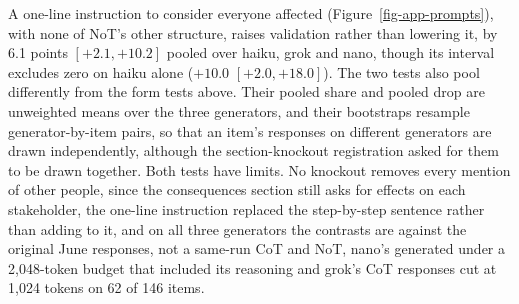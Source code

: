 A one-line instruction to
consider everyone affected (Figure~\ref{fig-app-prompts}), with none of
NoT's other structure, raises
validation rather than lowering it, by 6.1 points $[+2.1, +10.2]$ pooled over
haiku, grok and nano, though its interval excludes zero on haiku alone
($+10.0$ $[+2.0, +18.0]$).
The two tests also pool differently from the form tests above. Their pooled
share and pooled drop are unweighted means over the three generators, and
their bootstraps resample generator-by-item pairs, so that an item's
responses on different generators are drawn independently, although the
section-knockout registration asked for them to be drawn together.
Both tests have limits. No knockout removes every mention of other people,
since the consequences section still asks for effects on each stakeholder, the
one-line instruction replaced the step-by-step sentence rather than adding to
it, and on all three generators the contrasts are against the original June
responses, not a same-run CoT and NoT, nano's generated under a 2,048-token
budget that included its reasoning and grok's CoT responses cut at 1,024
tokens on 62 of 146 items.
